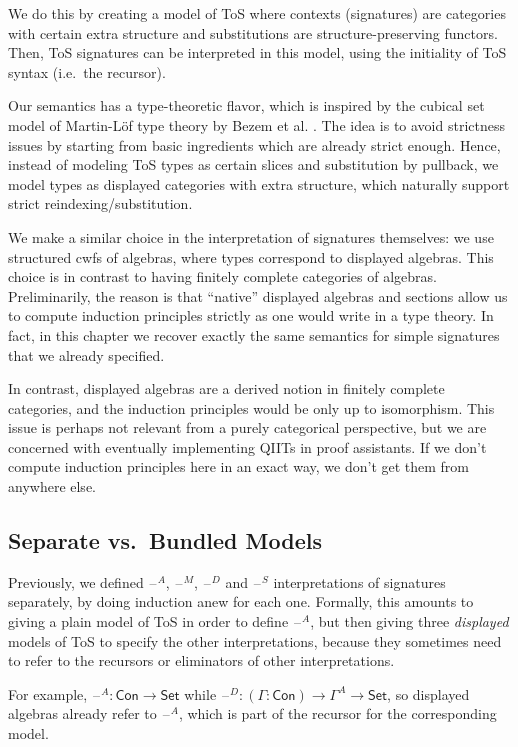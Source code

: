 \documentclass[12pt,a4paper,twoside,openany]{book}
\theoremstyle{remark}
\theoremstyle{definition}
\theoremstyle{theorem}
\newcommand{\Con}{\mathsf{Con}}
\newcommand{\blank}{\mathord{\hspace{1pt}\text{--}\hspace{1pt}}}
\newcommand{\Set}{\mathsf{Set}}
\begin{document}
We do this by creating a model of ToS where contexts (signatures) are categories
with certain extra structure and substitutions are structure-preserving
functors. Then, ToS signatures can be interpreted in this model, using the
initiality of ToS syntax (i.e.\ the recursor).

Our semantics has a type-theoretic flavor, which is inspired by the cubical set
model of Martin-Löf type theory by Bezem et al. \cite{cubicalmodel}. The idea is
to avoid strictness issues by starting from basic ingredients which are already
strict enough. Hence, instead of modeling ToS types as certain slices and
substitution by pullback, we model types as displayed categories with extra
structure, which naturally support strict reindexing/substitution.

We make a similar choice in the interpretation of signatures themselves: we use
structured cwfs of algebras, where types correspond to displayed algebras. This
choice is in contrast to having finitely complete categories of algebras.
Preliminarily, the reason is that ``native'' displayed algebras and sections
allow us to compute induction principles strictly as one would write in a type
theory. In fact, in this chapter we recover exactly the same semantics for
simple signatures that we already specified.

In contrast, displayed algebras are a derived notion in finitely complete
categories, and the induction principles would be only up to isomorphism.  This
issue is perhaps not relevant from a purely categorical perspective, but we are
concerned with eventually implementing QIITs in proof assistants. If we don't
compute induction principles here in an exact way, we don't get them from
anywhere else.

\subsection{Separate vs.\ Bundled Models}

Previously, we defined $\blank^A$, $\blank^M$, $\blank^D$ and $\blank^S$
interpretations of signatures separately, by doing induction anew for each
one. Formally, this amounts to giving a plain model of ToS in order to define
$\blank^A$, but then giving three \emph{displayed} models of ToS to specify the
other interpretations, because they sometimes need to refer to the recursors or
eliminators of other interpretations.

For example, $\blank^A : \Con \to \Set$ while $\blank^D : (\Gamma : \Con) \to
\Gamma^A \to \Set$, so displayed algebras already refer to $\blank^A$, which is
part of the recursor for the corresponding model.
\end{document}
